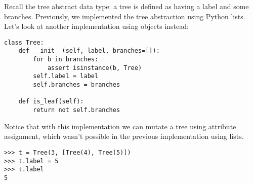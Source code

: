 Recall the tree abstract data type: a tree is defined as having a label and
some branches. Previously, we implemented the tree abstraction using Python
lists.  Let's look at another implementation using objects instead:

\begin{lstlisting}
class Tree:
    def __init__(self, label, branches=[]):
        for b in branches:
            assert isinstance(b, Tree)
        self.label = label
        self.branches = branches

    def is_leaf(self):
        return not self.branches
\end{lstlisting}

Notice that with this implementation we can mutate a tree using attribute
assignment, which wasn't possible in the previous implementation using lists.

\begin{lstlisting}
>>> t = Tree(3, [Tree(4), Tree(5)])
>>> t.label = 5
>>> t.label
5
\end{lstlisting}
